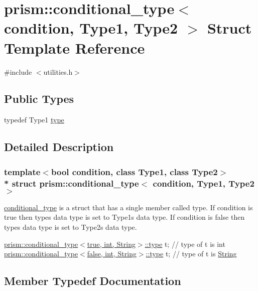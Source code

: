 \hypertarget{structprism_1_1conditional__type}{}\section{prism\+:\+:conditional\+\_\+type$<$ condition, Type1, Type2 $>$ Struct Template Reference}
\label{structprism_1_1conditional__type}


{\ttfamily \#include $<$utilities.\+h$>$}

\subsection*{Public Types}
\begin{DoxyCompactItemize}
\item 
typedef Type1 \hyperlink{structprism_1_1conditional__type_a9d57ba7c29ee017e38e49bbb72229b7e}{type}
\end{DoxyCompactItemize}


\subsection{Detailed Description}
\subsubsection*{template$<$bool condition, class Type1, class Type2$>$\\*
struct prism\+::conditional\+\_\+type$<$ condition, Type1, Type2 $>$}

\hyperlink{structprism_1_1conditional__type}{conditional\+\_\+type} is a struct that has a single member called type. If condition is true then type\textquotesingle{}s data type is set to Type1\textquotesingle{}s data type. If condition is false then type\textquotesingle{}s data type is set to Type2\textquotesingle{}s data type.

\hyperlink{structprism_1_1conditional__type_a9d57ba7c29ee017e38e49bbb72229b7e}{prism\+::conditional\+\_\+type$<$true, int, String$>$\+::type} t; // type of t is int \hyperlink{structprism_1_1conditional__type_a9d57ba7c29ee017e38e49bbb72229b7e}{prism\+::conditional\+\_\+type$<$false, int, String$>$\+::type} t; // type of t is \hyperlink{classprism_1_1_string}{String} 

\subsection{Member Typedef Documentation}
